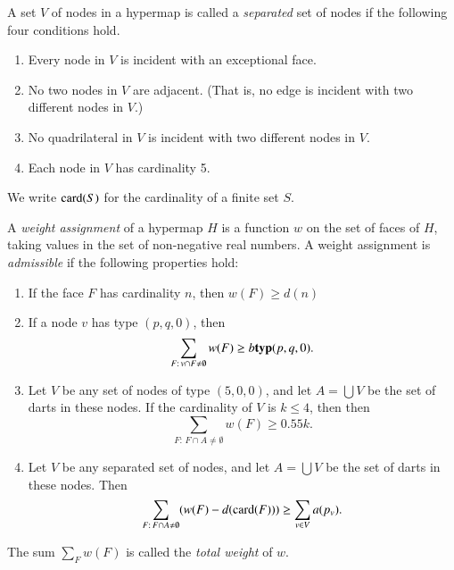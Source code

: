 \begin{definition}[separated]
A set $V$ of nodes in a hypermap is called a {\it separated\/} set
of nodes if the following four conditions hold.
%
    \begin{enumerate}
      \item Every node in $V$ is incident with an exceptional face.
      \item No two
        nodes in $V$ are adjacent.  (That is, no edge is incident
        with two different nodes in $V$.)
      \item No quadrilateral in $V$ is incident with two different nodes
        in $V$.
      \item Each node in $V$ has cardinality 5.
    \end{enumerate}
\end{definition}

We write ${\operatorname{card}}(S)$ for the cardinality of a finite set $S$.


\begin{definition}
%
A {\it weight assignment\/} of a hypermap $H$ is a function $w$ on
the set of faces of $H$, taking values in the set of non-negative
real numbers. A weight assignment is {\it admissible} if the
following properties hold:
%
\begin{enumerate}
  \item If the face $F$ has cardinality $n$, then
        $w(F) \ge d(n)$
  \item If a node $v$ has type $(p,q,0)$, then
        $$\sum_{F:\,v\cap F\ne\emptyset} w(F) \ge b{{\operatorname{\bf typ}}{(p,q,0)}}.$$
        \label{admissible:b}
  \item Let $V$ be any set of nodes of type $(5,0,0)$, and let $A =\bigcup V$ be
        the set of darts in these nodes.
        If the cardinality of $V$ is $k\le 4$, then
        then
        $$\sum_{F:\,F\cap A\ne\emptyset} w(F) \ge 0.55 k.$$
  \item Let $V$ be any separated set of nodes, and let $A =\bigcup V$ be
        the set of darts in these nodes.
        Then
        $$\sum_{F:\,F\cap A\ne\emptyset} (w(F) -d({\operatorname{card}}(F)))
            \ge \sum_{v\in V} a(p_v).$$
        \label{definition:admissible:excess}
\end{enumerate}
The sum $\sum_F w(F)$ is called the {\it total weight} of $w$.
\end{definition}





